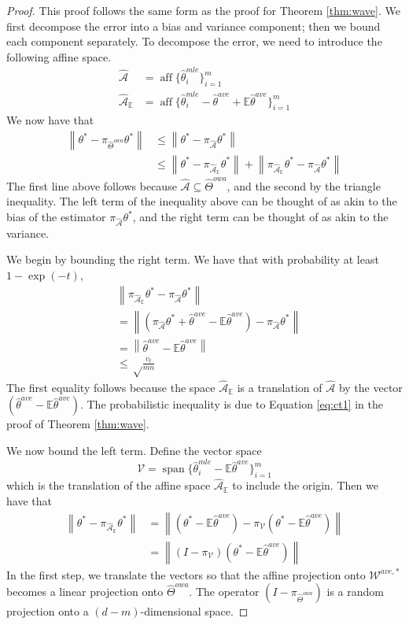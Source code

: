 \documentclass[twoside]{article}
\DeclareMathOperator*{\vecspan}{span}
\DeclareMathOperator*{\affspan}{aff}
\newcommand{\W}{{\hat \Theta^{\textit{owa}}}}
\newcommand{\Waff}{\mathcal{\hat A}}
\newcommand{\WaffE}{{\mathcal{\hat A}_\E}}
\newcommand{\Wave}{{\mathcal{\hat W}^{ave}}}
\newcommand{\Wtave}{{\mathcal{W}^{ave,*}}}
\newcommand{\V}{\mathcal{V}}
\newcommand{\E}{\mathbb{E}}
\newcommand{\w}{\theta}
\newcommand{\wave}{\hat\w^{ave}}
\newcommand{\wtave}{\E\hat\w^{ave}}
\newcommand{\wmle}{\hat\w^{mle}}
\newcommand{\wstar}{{\w^{*}}}
\newcommand{\ltwo}[1]{{\left\lVert {#1} \right\rVert}}
\newcommand{\proj}[1]{\pi_{{#1}}}
\begin{document}
\begin{proof}
This proof follows the same form as the proof for Theorem \ref{thm:wave}.
We first decompose the error into a bias and variance component;
then we bound each component separately.
To decompose the error, we need to introduce the following affine space.
\begin{align}
\Waff&=\affspan \{\wmle_i\}_{i=1}^m
\\
\WaffE&=\affspan \{\wmle_i - \wave + \E\wave\}_{i=1}^m
\end{align}
We now have that
\begin{align}
\ltwo{\wstar-\proj\W\wstar}
&\le
\ltwo{\wstar-\proj\Waff\wstar}
\\
&\le
\ltwo{\wstar-\proj\WaffE\wstar}
+
\ltwo{\proj\WaffE\wstar-\proj\Waff\wstar}
\end{align}
The first line above follows because $\Waff\subseteq\W$,
and the second by the triangle inequality.
The left term of the inequality above can be thought of as akin to the bias of the estimator $\proj\Waff\wstar$,
and the right term can be thought of as akin to the variance.

We begin by bounding the right term.
We have that with probability at least $1-\exp(-t)$,
\begin{align}
&\ltwo{\proj\WaffE\wstar-\proj\Waff\wstar}
\\
&=
\ltwo{(\proj\Waff\wstar+\wave-\wtave)-\proj\Waff\wstar}
\\&=
\ltwo{\wave-\wtave}
\\&\le
\sqrt\frac{v_t}{mn}
\end{align}
The first equality follows because the space $\WaffE$ is a translation of $\Waff$ by the vector $(\wave-\wtave)$.
The probabilistic inequality is due to Equation \ref{eq:ct1} in the proof of Theorem \ref{thm:wave}.

We now bound the left term.
Define the vector space
\begin{equation}
\V=\vecspan \{\wmle_i - \wtave\}_{i=1}^m
\end{equation}
which is the translation of the affine space $\WaffE$ to include the origin.
Then we have that
\begin{align}
\ltwo{\wstar-\proj\WaffE\wstar}
&=
\ltwo{(\wstar-\wtave)-\proj\V(\wstar-\wtave)}
\\&=
\ltwo{(I-\proj\V)(\wstar-\wtave)}
\end{align}
In the first step, we translate the vectors so that the affine projection onto $\Wtave$ becomes a linear projection onto $\W$.
The operator $(I-\proj\W)$ is a random projection onto a $(d-m)$-dimensional space.


\end{proof}
\end{document}
